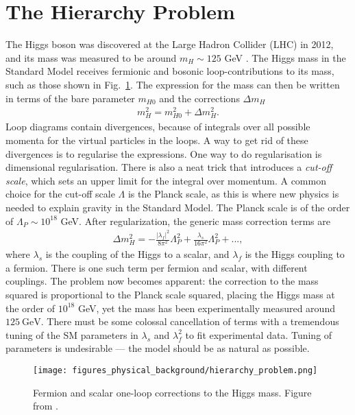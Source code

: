 \documentclass[twoside,english]{uiofysmaster}
\begin{document}
\section{The Hierarchy Problem}

The Higgs boson was discovered at the Large Hadron Collider (LHC) in 2012, and its mass was measured to be around $m_H \sim 125$ GeV \cite{Aad:2012tfa}. The Higgs mass in the Standard Model receives fermionic and bosonic loop-contributions to its mass, such as those shown in Fig.~\ref{Fig:: Phys. bac.: Higgs mass contributions}. The expression for the mass can then be written in terms of the bare parameter $m_{H0}$ and the corrections $\Delta m_H$
\begin{align*}
m_H^2 = m_{H0}^2 + \Delta m_H^2.
\end{align*}
Loop diagrams contain divergences, because of integrals over all possible momenta for the virtual particles in the loops. A way to get rid of these divergences is to regularise the expressions. One way to do regularisation is dimensional regularisation. There is also a neat trick that introduces a \textit{cut-off scale}, which sets an upper limit for the integral over momentum. A common choice for the cut-off scale $\Lambda$ is the Planck scale, as this is where new physics is needed to explain gravity in the Standard Model. The Planck scale is of the order of $\Lambda_P \sim 10^{18}$ GeV. After regularization, the generic mass correction terms are
\begin{align}
\Delta m_H^2 = - \frac{|\lambda_f|^2}{8\pi^2} \Lambda_P^2 + \frac{\lambda_s}{16\pi^2} \Lambda_P^2 +...,
\end{align}
where $\lambda_s$ is the coupling of the Higgs to a scalar, and $\lambda_f$ is the Higgs coupling to a fermion. There is one such term per fermion and scalar, with different couplings. The problem now becomes apparent: the correction to the mass squared is proportional to the Planck scale squared, placing the Higgs mass at the order of $10^{18}$ GeV, yet the mass has been experimentally measured around $125~\mathrm{GeV}$. There must be some colossal cancellation of terms with a tremendous tuning of the SM parameters in $\lambda_s$ and $\lambda_f^2$ to fit experimental data. Tuning of parameters is undesirable --- the model should be as natural as possible. 

\begin{figure}[H]
\centering
\texttt{[image: figures\_physical\_background/hierarchy\_problem.png]}
\caption{Fermion and scalar one-loop corrections to the Higgs mass. Figure from \cite{batzing2017lecture}.}
\label{Fig:: Phys. bac.: Higgs mass contributions}
\end{figure}
\end{document}

